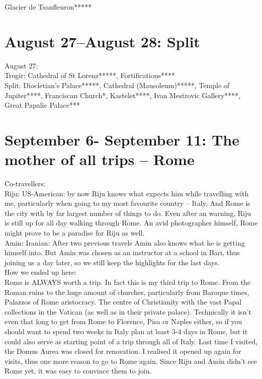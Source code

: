 Glacier de Tsanfleuron*****

\section{August 27--August 28: Split}
\label{split2017}

August 27:\\
Trogir: Cathedral of St Lorenz*****, Fortifications****\\
Split: Diocletian's Palace*****, Cathedral (Mausoleum)*****, Temple of Jupiter****, Franciscan Church*, Kastelet****, Ivan Mestrovic Gallery****, Great Papalic Palace***

\section{September 6- September 11: The mother of all trips -- Rome}
\label{2017:Rome}

Co-travellers:\\
Riju: US-American: by now Riju knows what expects him while travelling with me, particularly when going to my most favourite country -- Italy. And Rome is the city with by far largest number of things to do. Even after an warning, Riju is still up for all day walking through Rome. An avid photographer himself, Rome might prove to be a paradise for Riju as well.\\
Amin: Iranian: After two previous travels Amin also knows what he is getting himself into. But Amin was chosen as an instructor at a school in Bari, thus joining us a day later, so we still keep the highlights for the last days.\\

How we ended up here:\\
Rome is ALWAYS worth a trip. In fact this is my third trip to Rome. From the Roman ruins to the huge amount of churches, particularly from Baroque times, Palazzos of Rome aristocracy. The centre of Christianity with the vast Papal collections in the Vatican (as well as in their private palace). Technically it isn't even that long to get from Rome to Florence, Pisa or Naples either, so if you should want to spend two weeks in Italy plan at least 3-4 days in Rome, but it could also serve as starting point of a trip through all of Italy. Last time I visited, the Domus Aurea was closed for renovation. I realised it opened up again for visits, thus one more reason to go to Rome again. Since Riju and Amin didn't see Rome yet, it was easy to convince them to join.\\

